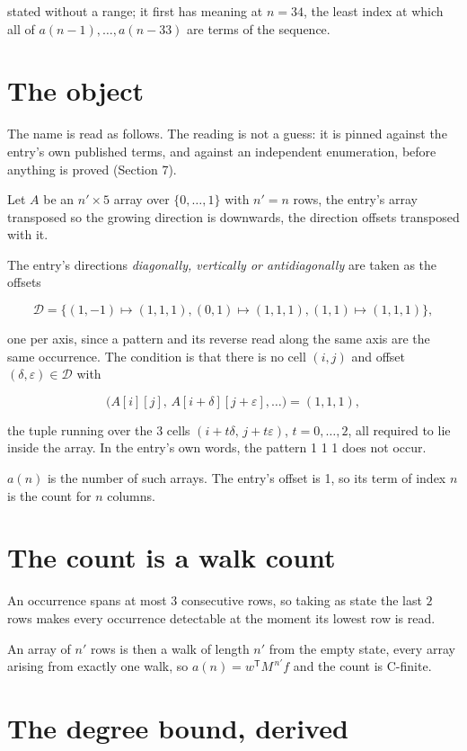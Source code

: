 \documentclass[11pt]{article}
\theoremstyle{definition}
\begin{document}
stated without a range; it first has meaning at $n = 34$, the least index at which all of $a(n-1),\dots,a(n-33)$ are terms of the sequence.

\section{The object}

The name is read as follows. The reading is not a guess: it is pinned against the entry's own published terms, and against an independent enumeration, before anything is proved (Section 7).

Let $A$ be an $n' \times 5$ array over $\{0,\dots,1\}$ with $n' = n$ rows, the entry's array transposed so the growing direction is downwards, the direction offsets transposed with it.

The entry's directions {\itshape diagonally, vertically or antidiagonally} are taken as the offsets

\[\mathcal{D} = \{(1,-1)\mapsto(1,1,1), (0,1)\mapsto(1,1,1), (1,1)\mapsto(1,1,1)\},\]

one per axis, since a pattern and its reverse read along the same axis are the same occurrence. The condition is that there is no cell $(i,j)$ and offset $(\delta,\varepsilon)\in\mathcal{D}$ with

\[\bigl(A[i][j],\,A[i{+}\delta][j{+}\varepsilon],\dots\bigr) = (1, 1, 1),\]

the tuple running over the $3$ cells $(i+t\delta,\,j+t\varepsilon)$, $t = 0,\dots,2$, all required to lie inside the array. In the entry's own words, the pattern 1 1 1 does not occur.

$a(n)$ is the number of such arrays. The entry's offset is 1, so its term of index $n$ is the count for $n$ columns.

\section{The count is a walk count}

An occurrence spans at most $3$ consecutive rows, so taking as state the last $2$ rows makes every occurrence detectable at the moment its lowest row is read.

An array of $n'$ rows is then a walk of length $n'$ from the empty state, every array arising from exactly one walk, so $a(n) = w^{\mathsf T}M^{\,n'}f$ and the count is C-finite.

\section{The degree bound, derived}
\end{document}
